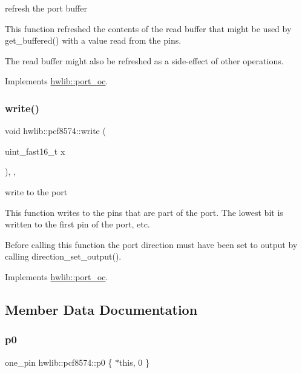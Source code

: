 refresh the port buffer

This function refreshed the contents of the read buffer that might be used by get\+\_\+buffered() with a value read from the pins.

The read buffer might also be refreshed as a side-\/effect of other operations. 

Implements \hyperlink{classhwlib_1_1port__oc_aa4488183f5cf241ba48ad4dd1a89e42a}{hwlib\+::port\+\_\+oc}.

\mbox{\label{classhwlib_1_1pcf8574_a19abea394995fc9aa2fa628c263421fa}} 
\subsubsection{\texorpdfstring{write()}{write()}}
{\footnotesize\ttfamily void hwlib\+::pcf8574\+::write (\begin{DoxyParamCaption}\item[{uint\+\_\+fast16\+\_\+t}]{x }\end{DoxyParamCaption})\hspace{0.3cm}{\ttfamily [inline]}, {\ttfamily [override]}, {\ttfamily [virtual]}}





write to the port

This function writes to the pins that are part of the port. The lowest bit is written to the first pin of the port, etc.

Before calling this function the port direction must have been set to output by calling direction\+\_\+set\+\_\+output(). 

Implements \hyperlink{classhwlib_1_1port__oc_aa5889aedda709f045730db9859e4fcf4}{hwlib\+::port\+\_\+oc}.



\subsection{Member Data Documentation}
\mbox{\label{classhwlib_1_1pcf8574_abfbddc460aa984329c07e7b3913eb4f1}} 
\subsubsection{\texorpdfstring{p0}{p0}}
{\footnotesize\ttfamily one\+\_\+pin hwlib\+::pcf8574\+::p0 \{ $\ast$this, 0 \}}

